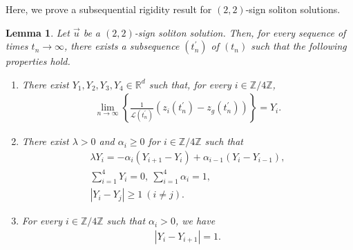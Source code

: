 \documentclass[reqno]{amsart}
\theoremstyle{plain}
\newtheorem{lemma}[theorem]{Lemma}
\theoremstyle{definition}
\numberwithin{equation}{section}
\begin{document}
Here, we prove a subsequential rigidity result for $(2,2)$-sign soliton solutions.

\begin{lemma}\label{tenretujouken}
Let $\vec{u}$ be a $(2,2)$-sign soliton solution. Then, for every sequence of times $t_n\to\infty$, there exists a subsequence $(t_n^{\prime})$ of $(t_n)$ such that the following properties hold.
\begin{enumerate}
\item There exist $Y_1,Y_2,Y_3,Y_4\in\mathbb{R}^d$ such that, for every $i\in\mathbb{Z}/4\mathbb{Z}$,
\begin{align}\label{abouttenretu1}
\lim_{n\to\infty}\left\{\frac{1}{\mathcal{L}(t_n^{\prime})}\left(z_i(t_n^{\prime})-z_g(t_n^{\prime})\right)\right\}=Y_i.
\end{align}

\item There exist $\lambda>0$ and $\alpha_i\geq 0$ for $i\in\mathbb{Z}/4\mathbb{Z}$ such that
\begin{align}
\lambda Y_i=-\alpha_i\left(Y_{i+1}-Y_i\right)+\alpha_{i-1}\left(Y_i-Y_{i-1}\right),\label{odekarakuru0808}
\\
\sum_{i=1}^4Y_i=0,\ \sum_{i=1}^4\alpha_i=1,\label{wateisuu0808}
\\
\left|Y_i-Y_j\right|\geq 1\ (i\neq j).\label{nagasa1ijou0808}
\end{align}

\item For every $i\in\mathbb{Z}/4\mathbb{Z}$ such that $\alpha_i>0$, we have
\begin{align*}
|Y_i-Y_{i+1}|=1.
\end{align*}
\end{enumerate}
\end{lemma}
\end{document}
